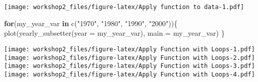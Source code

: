 \documentclass[
]{article}
\newenvironment{Shaded}{\begin{snugshade}}{\end{snugshade}}
\newcommand{\AttributeTok}[1]{\textcolor[rgb]{0.77,0.63,0.00}{#1}}
\newcommand{\ControlFlowTok}[1]{\textcolor[rgb]{0.13,0.29,0.53}{\textbf{#1}}}
\newcommand{\FunctionTok}[1]{\textcolor[rgb]{0.00,0.00,0.00}{#1}}
\newcommand{\NormalTok}[1]{#1}
\newcommand{\StringTok}[1]{\textcolor[rgb]{0.31,0.60,0.02}{#1}}
\begin{document}
\texttt{[image: workshop2\_files/figure-latex/Apply function to data-1.pdf]}

\begin{Shaded}
\begin{Highlighting}[]
\ControlFlowTok{for}\NormalTok{(my\_year\_var }\ControlFlowTok{in} \FunctionTok{c}\NormalTok{(}\StringTok{"1970"}\NormalTok{, }\StringTok{"1980"}\NormalTok{, }\StringTok{"1990"}\NormalTok{, }\StringTok{"2000"}\NormalTok{))\{}
  \FunctionTok{plot}\NormalTok{(}\FunctionTok{yearly\_subsetter}\NormalTok{(}\AttributeTok{year =}\NormalTok{ my\_year\_var), }\AttributeTok{main =}\NormalTok{ my\_year\_var)}
\NormalTok{\}}
\end{Highlighting}
\end{Shaded}

\texttt{[image: workshop2\_files/figure-latex/Apply Function with Loops-1.pdf]}
\texttt{[image: workshop2\_files/figure-latex/Apply Function with Loops-2.pdf]}
\texttt{[image: workshop2\_files/figure-latex/Apply Function with Loops-3.pdf]}
\texttt{[image: workshop2\_files/figure-latex/Apply Function with Loops-4.pdf]}
\end{document}
